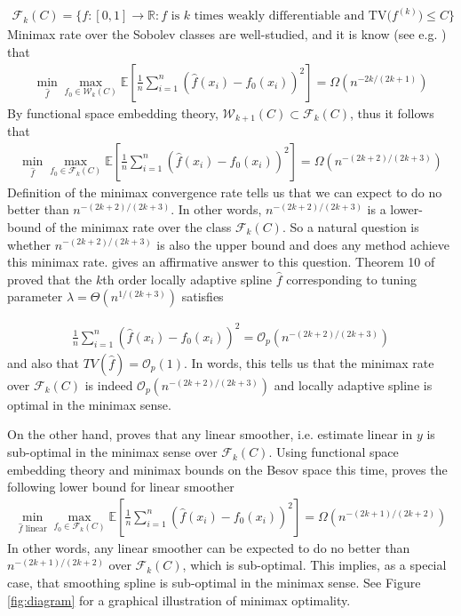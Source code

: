 \documentclass[a4paper]{article}
\newcommand{\RR}{\mathbb{R}}
\renewcommand{\cal}{\mathcal}
\newcommand{\E}{\mathbb{E}}
\begin{document}
\begin{align*}
\cal{F}_k(C)=\{f:[0, 1]\rightarrow \RR: f \text{ is $k$ times weakly differentiable and TV($f^{(k)}$)$\leq C$}\}
\end{align*}
Minimax rate over the Sobolev classes are well-studied, and it is know (see e.g. \cite{nussbaum1985spline}) that
\begin{align*}
\min_{\hat{f}}\max_{f_0\in\cal{W}_k(C)} \E[\frac{1}{n}\sum_{i=1}^n(\hat{f}(x_i)-f_0(x_i))^2] = \Omega(n^{-2k/(2k+1)})
\end{align*}
By functional space embedding theory, $\cal{W}_{k+1}(C)\subset \cal{F}_k(C)$, thus it follows that
\begin{align*}
\min_{\hat{f}}\max_{f_0\in\cal{F}_k(C)}\E[\frac{1}{n}\sum_{i=1}^n(\hat{f}(x_i)-f_0(x_i))^2] = \Omega(n^{-(2k+2)/(2k+3)})
\end{align*}
Definition of the minimax convergence rate tells us that we can expect to do no better than $n^{-(2k+2)/(2k+3)}$. In other words, $n^{-(2k+2)/(2k+3)}$ is a lower-bound of the minimax rate over the class $\cal{F}_k(C)$. So a natural question is whether $n^{-(2k+2)/(2k+3)}$ is also the upper bound and does any method achieve this minimax rate. \cite{mammen1997locally} gives an affirmative answer to this question. Theorem 10 of \cite{mammen1997locally} proved that the $k$th order locally adaptive spline $\hat{f}$ corresponding to tuning parameter $\lambda=\Theta(n^{1/(2k+3)})$ satisfies

\begin{align*}
\frac{1}{n}\sum_{i=1}^n (\hat{f}(x_i)-f_0(x_i))^2 = \cal{O}_p(n^{-(2k+2)/(2k+3)})
\end{align*}
and also that $TV(\hat{f}) = \cal{O}_p(1)$. In words, this tells us that the minimax rate over $\cal{F}_k(C)$ is indeed $\cal{O}_p(n^{-(2k+2)/(2k+3)})$ and locally adaptive spline is optimal in the minimax sense. 

On the other hand, \cite{donoho1998minimax} proves that any linear smoother, i.e. estimate linear in $y$ is sub-optimal in the minimax sense over $\cal{F}_k(C)$. Using functional space embedding theory and minimax bounds on the Besov space this time, \cite{donoho1998minimax} proves the following lower bound for linear smoother
\begin{align*}
\min_{\hat{f}\text{ linear}}\max_{f_0\in\cal{F}_k(C)} \E[\frac{1}{n}\sum_{i=1}^n (\hat{f}(x_i) - f_0(x_i))^2] = \Omega(n^{-(2k+1)/(2k+2)})
\end{align*}
In other words, any linear smoother can be expected to do no better than $n^{-(2k+1)/(2k+2)}$ over $\cal{F}_k(C)$, which is sub-optimal. This implies, as a special case, that smoothing spline is sub-optimal in the minimax sense. See Figure \ref{fig:diagram} for a graphical illustration of minimax optimality.
\end{document}
